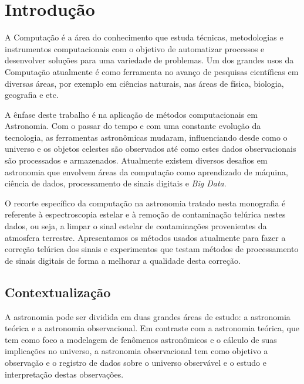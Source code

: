 \chapter{Introdução}
\label{cap:introducao}

A Computação é a área do conhecimento que estuda técnicas, metodologias e instrumentos computacionais com o objetivo de automatizar processos e desenvolver soluções para uma variedade de problemas. Um dos grandes usos da Computação atualmente é como ferramenta no avanço de pesquisas científicas em diversas áreas, por exemplo em ciências naturais, nas áreas de física, biologia, geografia e etc.

A ênfase deste trabalho é na aplicação de métodos computacionais em Astronomia. Com o passar do tempo e com uma constante evolução da tecnologia, as ferramentas astronômicas mudaram, influenciando desde como o universo e os objetos celestes são observados até como estes dados observacionais são processados e armazenados. Atualmente existem diversos desafios em astronomia que envolvem áreas da computação como aprendizado de máquina, ciência de dados, processamento de sinais digitais e \textit{Big Data}. 

O recorte específico da computação na astronomia tratado nesta monografia é referente à espectroscopia estelar e à remoção de contaminação telúrica nestes dados, ou seja, a limpar o sinal estelar de contaminações provenientes da atmosfera terrestre. Apresentamos os métodos usados atualmente para fazer a correção telúrica dos sinais e experimentos que testam métodos de processamento de sinais digitais de forma a melhorar a qualidade desta correção.

\section{Contextualização}

A astronomia pode ser dividida em duas grandes áreas de estudo: a astronomia teórica e a astronomia observacional. Em contraste com a astronomia teórica, que tem como foco a modelagem de fenômenos astronômicos e o cálculo de suas implicações no universo, a astronomia observacional tem como objetivo a observação e o registro de dados sobre o universo observável e o estudo e interpretação destas observações.  

